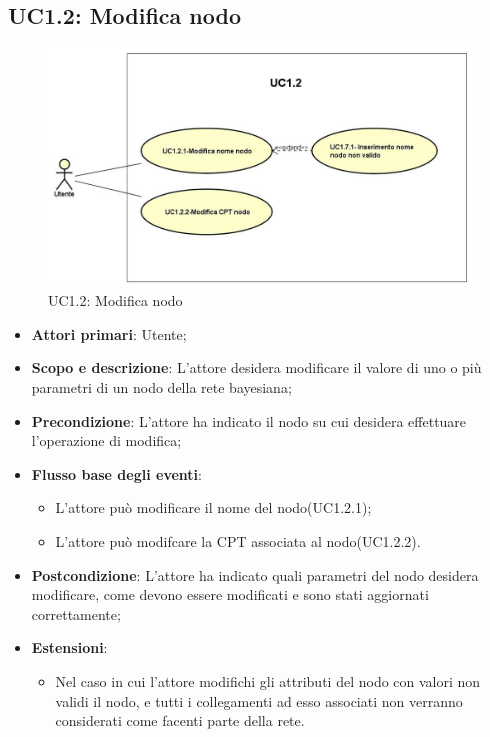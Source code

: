 \subsection{UC1.2: Modifica nodo} 
\begin{figure} [H]
	\centering
	\includegraphics[scale=0.45]{Img/UC1-2} 
	\caption{UC1.2: Modifica nodo} \label{} 
\end{figure} 
\begin{itemize} 
	\item{\textbf{Attori primari}: Utente;} 
	\item{\textbf{Scopo e descrizione}: L'attore desidera modificare il valore di uno o più parametri di un nodo della rete bayesiana;} 
	\item{\textbf{Precondizione}: L'attore ha indicato il nodo su cui desidera effettuare l'operazione di modifica;} 
	\item{\textbf{Flusso base degli eventi}: } 
	\begin{itemize} 
		\item{L'attore può modificare il nome del nodo(UC1.2.1);} 
		\item{L'attore può modifcare la CPT associata al nodo(UC1.2.2).} 		
	\end{itemize} 
	\item{\textbf{Postcondizione}: L'attore ha indicato quali parametri del nodo desidera modificare, come devono essere modificati e sono stati aggiornati correttamente;} 
	\item{\textbf{Estensioni}:} 
	\begin{itemize} 
		\item{Nel caso in cui l'attore modifichi gli attributi del nodo con valori non validi il nodo, e tutti i collegamenti ad esso associati non verranno considerati come facenti parte della rete.} 
	\end{itemize} 
\end{itemize} 
